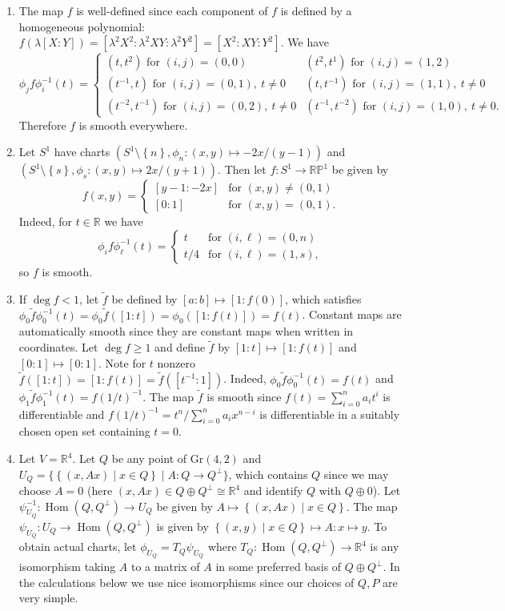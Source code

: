 \documentclass[11pt,leqno]{article}
\theoremstyle{plain}
\theoremstyle{definition}
\numberwithin{equation}{section}
\numberwithin{lem}{section}
\newcommand{\cbr}[1]{\left\{#1\right\}}
\DeclareMathOperator{\Hom}{Hom}
\newcommand{\Gr}{\mathrm{Gr}}
\begin{document}
\begin{enumerate}
\begin{enumerate}
    \end{enumerate}
    \item The map $f$ is well-defined since each component of $f$ is defined by a homogeneous polynomial: $f(\lambda[X:Y]) = [\lambda^2X^2:\lambda^2XY:\lambda^2Y^2] = [X^2:XY:Y^2]$. We have  
    \[\phi_jf\phi_i^{-1}(t)=\begin{cases}
      (t,t^2) \text{ for } (i,j) = (0,0) & (t^2,t^1) \text{ for } (i,j) = (1,2)\\
      (t^{-1},t) \text{ for } (i,j) = (0,1), ~t\neq 0 & (t,t^{-1}) \text{ for } (i,j) = (1,1),~ t\neq 0\\
      (t^{-2},t^{-1}) \text{ for } (i,j) = (0,2),~ t\neq 0 & (t^{-1},t^{-2}) \text{ for } (i,j) = (1,0),~ t\neq 0.
    \end{cases}\]
    Therefore $f$ is smooth everywhere.
    \item Let $S^1$ have charts $(S^1\setminus\cbr{n},\phi_n\colon(x,y)\mapsto -2x/(y-1))$ and $(S^1\setminus\cbr{s},\phi_s\colon (x,y)\mapsto 2x/(y+1))$. Then let $f\colon S^1\to \mathbb{RP}^1$ be given by 
    \[f(x,y) = \begin{cases}
      [y-1:-2x]& \text{for }(x,y) \neq (0,1)\\
      [0: 1] & \text{for }(x,y) = (0,1).
    \end{cases}\]
    Indeed, for $t\in\mathbb R$ we have 
    \[\phi_if\phi_\ell^{-1}(t) = \begin{cases}
       t & \text{for } (i,\ell) = (0,n)\\
       t/4 & \text{for } (i,\ell) = (1,s),
    \end{cases}\] so $f$ is smooth.
    \item If $\deg f < 1$, let $\tilde f$ be defined by $[a:b]\mapsto [1:f(0)]$, which satisfies $\phi_0\tilde f\phi_0^{-1}(t) = \phi_0\tilde f([1:t]) = \phi_0([1:f(t)]) = f(t)$. Constant maps are automatically smooth since they are constant maps when written in coordinates. Let $\deg f \geq 1$ and define $\tilde f$ by $[1:t]\mapsto [1:f(t)]$ and $[0:1]\mapsto [0:1]$. Note for $t$ nonzero $\tilde f([1:t]) = [1:f(t)] = \tilde f([t^{-1}:1])$. Indeed, $\phi_0\tilde f\phi_0^{-1}(t) = f(t)$ and $\phi_1\tilde f\phi_1^{-1}(t) = f(1/t)^{-1}$. The map $\tilde f$ is smooth since $f(t) = \sum_{i=0}^n a_it^i$ is differentiable and $f(1/t)^{-1} = t^n/\sum_{i=0}^n a_ix^{n-i}$ is differentiable in a suitably chosen open set containing $t=0$. 
    \item Let $V = \mathbb R^4$. Let $Q$ be any point of $\Gr(4,2)$ and $U_Q = \{\cbr{(x,Ax)\mid x\in Q}\mid A\colon Q\to Q^\perp\}$, which contains $Q$ since we may choose $A = 0$ (here $(x,Ax)\in Q\oplus Q^\perp\cong \mathbb R^4$ and identify $Q$ with $Q\oplus 0$). Let $\psi_{U_Q}^{-1}\colon \Hom(Q,Q^\perp)\to U_Q$ be given by $A\mapsto \cbr{(x,Ax)\mid x\in Q}$. The map $\psi_{U_Q}\colon U_Q\to\Hom(Q,Q^\perp)$ is given by $\cbr{(x,y)\mid x\in Q}\mapsto A\colon x\mapsto y$. To obtain actual charts, let $\phi_{U_Q} = T_Q\psi_{U_Q}$ where $T_Q\colon \Hom(Q,Q^\perp)\to\mathbb R^4$ is any isomorphism taking $A$ to a matrix of $A$ in some preferred basis of $Q\oplus Q^\perp$. In the calculations below we use nice isomorphisms since our choices of $Q,P$ are very simple.
    

\end{enumerate}
\end{document}
